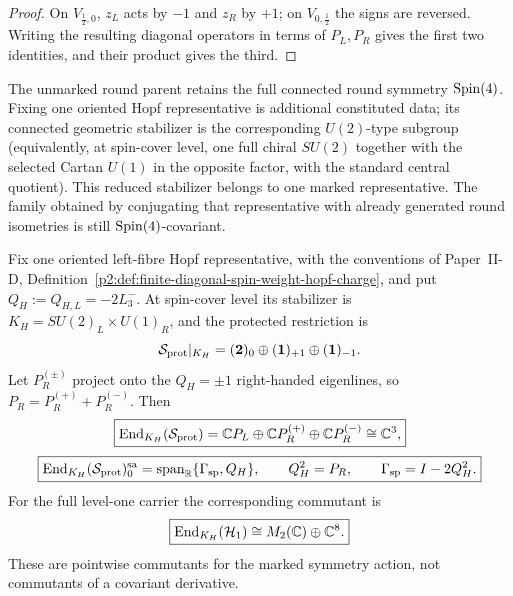 \documentclass[12pt,a4paper]{article}
\begin{document}
\begin{proof}
On \(V_{\frac12,0}\), \(z_L\) acts by \(-1\) and \(z_R\) by \(+1\); on
\(V_{0,\frac12}\) the signs are reversed.  Writing the resulting diagonal
operators in terms of \(P_L,P_R\) gives the first two identities, and their
product gives the third.
\end{proof}

\begin{remark}
\label{p2e:rem:marked-hopf-symmetry}
The unmarked round parent retains the full connected round symmetry
\(\mathrm{Spin}(4)\).  Fixing one oriented Hopf representative is additional
constituted data; its connected geometric stabilizer is the corresponding
\(U(2)\)-type subgroup (equivalently, at spin-cover level, one full chiral
\(SU(2)\) together with the selected Cartan \(U(1)\) in the opposite factor,
with the standard central quotient).  This reduced stabilizer belongs to one
marked representative.  The family obtained by conjugating that representative
with already generated round isometries is still \(\mathrm{Spin}(4)\)-covariant.
\end{remark}

\begin{theorem}
\label{p2e:thm:oriented-hopf-marked-commutants}
Fix one oriented left-fibre Hopf representative, with the conventions of
Paper~II-D, Definition~\ref{p2:def:finite-diagonal-spin-weight-hopf-charge},
and put \(Q_H:=Q_{H,L}=-2L_3^-\).  At spin-cover level its stabilizer is
\(K_H=SU(2)_L\times U(1)_R\), and the protected restriction is
\[
 \mathcal S_{\rm prot}|_{K_H}
 =(\mathbf2)_0\oplus(\mathbf1)_{+1}\oplus(\mathbf1)_{-1}.
\]
Let \(P_R^{(\pm)}\) project onto the \(Q_H=\pm1\) right-handed
eigenlines, so \(P_R=P_R^{(+)}+P_R^{(-)}\).  Then
\[
 \boxed{\operatorname{End}_{K_H}(\mathcal S_{\rm prot})
 =\mathbb CP_L\oplus\mathbb CP_R^{(+)}\oplus\mathbb CP_R^{(-)}
 \cong\mathbb C^3,}
\]
\[
 \boxed{\operatorname{End}_{K_H}(\mathcal S_{\rm prot})^{\rm sa}_0
 =\operatorname{span}_{\mathbb R}\{\Gamma_{\rm sp},Q_H\},\qquad
 Q_H^2=P_R,\qquad\Gamma_{\rm sp}=I-2Q_H^2.}
\]
For the full level-one carrier the corresponding commutant is
\[
 \boxed{\operatorname{End}_{K_H}(\mathcal H_1)\cong
 M_2(\mathbb C)\oplus\mathbb C^8.}
\]
These are pointwise commutants for the marked symmetry action, not
commutants of a covariant derivative.
\end{theorem}
\end{document}
